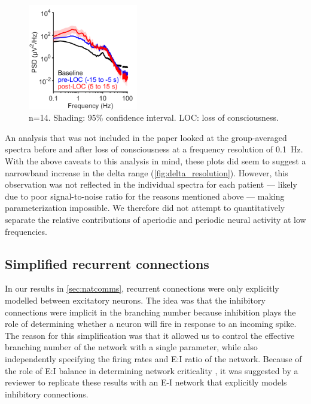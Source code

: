 \begin{figure}
\vspace{-19pt}
\centering
\includegraphics[width=48mm]{Figures/Discussion/delta_rhythms.png}
\vspace{-9pt}
\caption{ n=14. Shading: 95\% confidence interval. LOC: loss of consciousness.} \label{fig:delta_resolution}
\end{figure}

An analysis that was not included in the paper looked at the group-averaged spectra before and after loss of consciousness at a frequency resolution of \qty{0.1}{\hertz}. With the above caveats to this analysis in mind, these plots did seem to suggest a narrowband increase in the delta range (\autoref{fig:delta_resolution}). However, this observation was not reflected in the individual spectra for each patient --- likely due to poor signal-to-noise ratio for the reasons mentioned above –-- making parameterization impossible. We therefore did not attempt to quantitatively separate the relative contributions of aperiodic and periodic neural activity at low frequencies.

\subsection{Simplified recurrent connections}
In our results in \autoref{sec:natcomms}, recurrent connections were only explicitly modelled between excitatory neurons. The idea was that the inhibitory connections were implicit in the branching number because inhibition plays the role of determining whether a neuron will fire in response to an incoming spike. The reason for this simplification was that it allowed us to control the effective branching number of the network with a single parameter, while also independently specifying the firing rates and E:I ratio of the network. Because of the role of E:I balance in determining network criticality \cite{Lombardi2017}, it was suggested by a reviewer to replicate these results with an E-I network that explicitly models inhibitory connections. 

